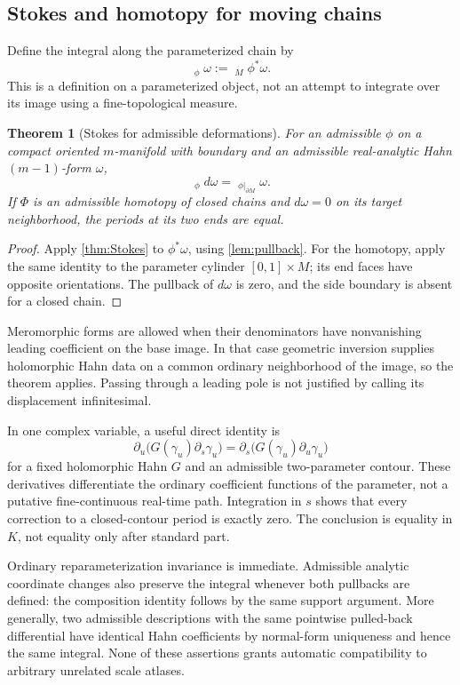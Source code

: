 \documentclass[11pt,letterpaper]{article}
\newtheorem{theorem}{Theorem}[section]
\theoremstyle{definition}
\theoremstyle{remark}
\newcommand{\HInt}{\mathop{\int^{\!H}}\nolimits}
\numberwithin{equation}{section}
\begin{document}
\subsection{Stokes and homotopy for moving chains}
Define the integral along the parameterized chain by
\[
\HInt_\phi\omega:=\HInt_M\phi^*\omega.
\]
This is a definition on a parameterized object, not an attempt to integrate over its image using a fine-topological measure.

\begin{theorem}[Stokes for admissible deformations]\label{thm:movingStokes}
For an admissible $\phi$ on a compact oriented $m$-manifold with boundary and an admissible real-analytic Hahn $(m-1)$-form $\omega$,
\begin{equation}\label{eq:movingStokes}
\HInt_\phi d\omega=\HInt_{\phi|_{\partial M}}\omega.
\end{equation}
If $\Phi$ is an admissible homotopy of closed chains and $d\omega=0$ on its target neighborhood, the periods at its two ends are equal.
\end{theorem}
\begin{proof}
Apply \cref{thm:Stokes} to $\phi^*\omega$, using \cref{lem:pullback}. For the homotopy, apply the same identity to the parameter cylinder $[0,1]\times M$; its end faces have opposite orientations. The pullback of $d\omega$ is zero, and the side boundary is absent for a closed chain.
\end{proof}
Meromorphic forms are allowed when their denominators have nonvanishing leading coefficient on the base image. In that case geometric inversion supplies holomorphic Hahn data on a common ordinary neighborhood of the image, so the theorem applies. Passing through a leading pole is not justified by calling its displacement infinitesimal.

In one complex variable, a useful direct identity is
\begin{equation}\label{eq:variation}
\partial_u\bigl(G(\gamma_u)\partial_s\gamma_u\bigr)
=\partial_s\bigl(G(\gamma_u)\partial_u\gamma_u\bigr)
\end{equation}
for a fixed holomorphic Hahn $G$ and an admissible two-parameter contour. These derivatives differentiate the ordinary coefficient functions of the parameter, not a putative fine-continuous real-time path. Integration in $s$ shows that every correction to a closed-contour period is exactly zero. The conclusion is equality in $K$, not equality only after standard part.

Ordinary reparameterization invariance is immediate. Admissible analytic coordinate changes also preserve the integral whenever both pullbacks are defined: the composition identity follows by the same support argument. More generally, two admissible descriptions with the same pointwise pulled-back differential have identical Hahn coefficients by normal-form uniqueness and hence the same integral. None of these assertions grants automatic compatibility to arbitrary unrelated scale atlases.
\end{document}
